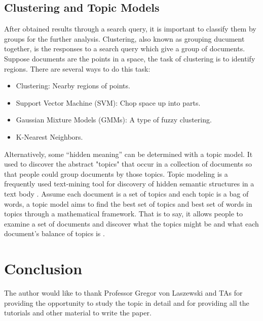 \documentclass[sigconf]{acmart}
\begin{document}
\subsection{Clustering and Topic Models}
After obtained results through a search query, it is important to classify them by groups for the further analysis. Clustering, also known as grouping ducument together, is the responses to a search query which give a group of documents. Suppose documents are the points in a space, the task of clustering is to identify regions. There are several ways to do this task:
\begin{itemize}
\item Clustering: Nearby regions of points.
\item Support Vector Machine (SVM): Chop space up into parts.
\item Gaussian Mixture Models (GMMs): A type of fuzzy clustering.
\item K-Nearest Neighbors.
\end{itemize}

Alternatively, some “hidden meaning” can be determined with a topic model. It used to discover the abstract "topics" that occur in a collection of documents so that people could group documents by those topics. Topic modeling is a frequently used text-mining tool for discovery of hidden semantic structures in a text body \cite{editor11}. Assume each document is a set of topics and each topic is a bag of words, a topic model aims to find the best set of topics and best set of words in topics through a mathematical framework. That is to say, it allows people to examine a set of documents and discover what the topics might be and what each document's balance of topics is \cite{editor11}.

\section{Conclusion}


\begin{acks}
The author would like to thank Professor Gregor von Laszewski and TAs for providing the opportunity to study the topic in detail and for providing all the tutorials and other material to write the paper.

\end{acks}


 
\end{document}
